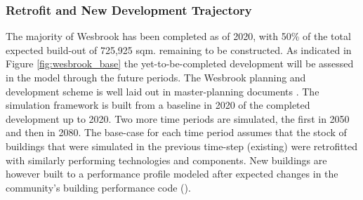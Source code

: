 \documentclass[twocolumn, a4paper,10pt]{article}
\begin{document}
\subsubsection*{Retrofit and New Development Trajectory}
The majority of Wesbrook has been completed as of 2020, with 50\% of the total expected build-out of 725,925 sqm. remaining to be constructed. As indicated in Figure \ref{fig:wesbrook_base} the yet-to-be-completed development will be assessed in the model through the future periods. The Wesbrook planning and development scheme is well laid out in master-planning documents \citep{ubc_planning_ubc_2020_wb}. The simulation framework is built from a baseline in 2020 of the completed development up to 2020. Two more time periods are simulated, the first in 2050 and then in 2080. The base-case for each time period assumes that the stock of buildings that were simulated in the previous time-step (existing) were retrofitted with similarly performing technologies and components. New buildings are however built to a performance profile modeled after expected changes in the community's building performance code (\citep{noauthor_residential_2021}). 

\end{document}
